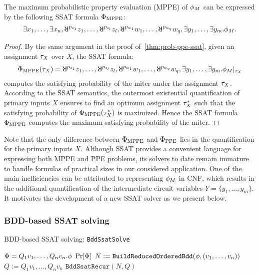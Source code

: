 \begin{theorem}
    \label{thm:prob-mppe-ssat}
    The maximum probabilistic property evaluation (MPPE) of $\phi_M$ can be expressed
    by the following SSAT formula $\Phi_\mathrm{MPPE}$:
    \begin{align}
        \label{eq:prob-mppe-ssat}
        \exists x_1,\ldots,\exists x_n,
        \random{p_{z_1}}z_1,\ldots,\random{p_{z_l}}z_l,
        \random{p_{w_1}}w_1,\ldots,\random{p_{w_q}}w_q,
        \exists y_1,\ldots,\exists y_m.
        \pf_M.
    \end{align}
\end{theorem}
\begin{proof}
    By the same argument in the proof of~\cref{thm:prob-ppe-ssat},
    given an assignment $\tau_X$ over $X$,
    the SSAT formula:
    \begin{align*}
        \Qf_\mathrm{MPPE}(\as_X)=
        \random{p_{z_1}}{z_1},\ldots,\random{p_{z_l}}{z_l},
        \random{p_{w_1}}{w_1},\ldots,\random{p_{w_q}}{w_q},
        \exists y_1,\ldots,\exists y_m.
        \pcf{\pf_M}{\as_X}
    \end{align*}
    computes the satisfying probability of the miter under the assignment $\tau_X$.
    According to the SSAT semantics,
    the outermost existential quantification of primary inputs $X$
    ensures to find an optimum assignment $\tau_X^*$
    such that the satisfying probability of $\Phi_\mathrm{MPPE}(\tau_X^*)$ is maximized.
    Hence the SSAT formula $\Phi_\mathrm{MPPE}$ computes the maximum satisfying probability of the miter.
\end{proof}

Note that the only difference between $\Phi_\mathrm{MPPE}$ and $\Phi_\mathrm{PPE}$
lies in the quantification for the primary inputs $X$.
Although SSAT provides a convenient language for expressing both MPPE and PPE problems,
its solvers to date remain immature to handle formulas of practical sizes in our considered application.
One of the main inefficiencies can be attributed to representing $\phi_M$ in CNF,
which results in the additional quantification of the intermediate circuit variables $Y=\{y_1,\ldots,y_m\}$.
It motivates the development of a new SSAT solver as we present below.

\subsubsection{BDD-based SSAT solving}

\begin{algorithm}[t]
    \caption{BDD-based SSAT solving: \texttt{BddSsatSolve}}
    \label{alg:bddssat}
    \begin{algorithmic}[1]
        \REQUIRE $\Phi=Q_1 v_1,\ldots,Q_n v_n.\phi$
        \ENSURE $\Pr[\Phi]$
        \STATE $N := \texttt{BuildReducedOrderedBdd}(\phi,(v_1,\ldots,v_n))$\label{code:bddssat-build-bdd}
        \STATE $Q := Q_1 v_1,\ldots,Q_n v_n$
        \RETURN $\texttt{BddSsatRecur}(N,Q)$\label{code:bddssat-recursive}
    \end{algorithmic}
\end{algorithm}

